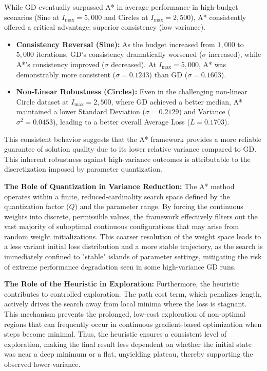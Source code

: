 While GD eventually surpassed A* in average performance in high-budget scenarios (Sine at $I_{\text{max}}=5,000$ and Circles at $I_{\text{max}}=2,500$), A* consistently offered a critical advantage: superior consistency (low variance).
\begin{itemize}
    \item \textbf{Consistency Reversal (Sine):} As the budget increased from $1,000$ to $5,000$ iterations, GD's consistency dramatically worsened ($\sigma$ increased), while A*'s consistency improved ($\sigma$ decreased). At $I_{\text{max}}=5,000$, A* was demonstrably more consistent ($\sigma = 0.1243$) than GD ($\sigma = 0.1603$).
    \item \textbf{Non-Linear Robustness (Circles):} Even in the challenging non-linear Circle dataset at $I_{\text{max}}=2,500$, where GD achieved a better median, A* maintained a lower Standard Deviation ($\sigma = 0.2129$) and Variance ($\sigma^2 = 0.0453$), leading to a better overall Average Loss ($\bar{L}=0.1703$).
\end{itemize}

\noindent This consistent behavior suggests that the A* framework provides a more reliable guarantee of solution quality due to its lower relative variance compared to GD. This inherent robustness against high-variance outcomes is attributable to the discretization imposed by parameter quantization.

\noindent \textbf{The Role of Quantization in Variance Reduction:} The A* method operates within a finite, reduced-cardinality search space defined by the quantization factor ($Q$) and the parameter range. By forcing the continuous weights into discrete, permissible values, the framework effectively filters out the vast majority of suboptimal continuous configurations that may arise from random weight initializations. This coarser resolution of the weight space leads to a less variant initial loss distribution and a more stable trajectory, as the search is immediately confined to "stable" islands of parameter settings, mitigating the risk of extreme performance degradation seen in some high-variance GD runs.

\noindent \textbf{The Role of the Heuristic in Exploration:} Furthermore, the heuristic contributes to controlled exploration. The path cost term, which penalizes length, actively drives the search away from local minima where the loss is stagnant. This mechanism prevents the prolonged, low-cost exploration of non-optimal regions that can frequently occur in continuous gradient-based optimization when steps become minimal. Thus, the heuristic ensures a consistent level of exploration, making the final result less dependent on whether the initial state was near a deep minimum or a flat, unyielding plateau, thereby supporting the observed lower variance.

